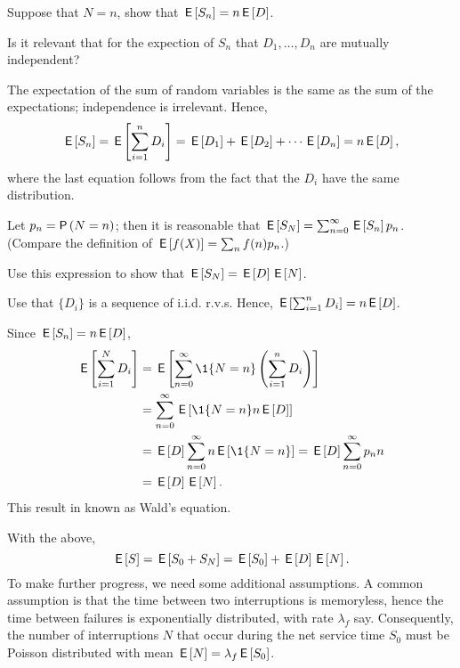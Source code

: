 \begin{exercise}
  Suppose that $N=n$, show that $\,\mathsf{E}\left[S_n\right]=n\,\mathsf{E}\left[D\right]$.

\begin{hint}
    Is it relevant that for the expection of $S_n$ that $D_1,\ldots, D_n$ are mutually independent?
  \end{hint}
\begin{solution}
The expectation of the sum of random variables is the same as the sum of the expectations; independence is irrelevant. Hence,
\begin{equation*}
  \,\mathsf{E}\left[S_n \right] =  \,\mathsf{E}\left[\sum_{i=1}^n D_i\right]= \,\mathsf{E}\left[D_1\right] + \,\mathsf{E}\left[D_2\right] + \cdots \,\mathsf{E}\left[D_n\right] = n \,\mathsf{E}\left[D\right],
\end{equation*}
where the last equation follows from the fact that the $D_i$ have the same distribution. 
\end{solution}
\end{exercise}

Let $p_n=\P{N=n}$; then it is reasonable that $\,\mathsf{E}\left[S_N\right]=\sum_{n=0}^\infty \,\mathsf{E}\left[S_n\right]p_n$. (Compare the definition of $\,\mathsf{E}\left[f(X)\right]=\sum_{n} f(n) p_n$.)

\begin{exercise}\label{ex:16}
Use this expression to show that $\,\mathsf{E}\left[S_N\right]=\,\mathsf{E}\left[D\right] \,\mathsf{E}\left[N\right]$.
\begin{hint}
  Use that $\{D_i\}$ is a sequence of i.i.d. r.v.s. Hence, $\,\mathsf{E}\left[\sum_{i=1}^n D_i\right] = n \,\mathsf{E}\left[D\right]$. 
\end{hint}
\begin{solution}
Since $\,\mathsf{E}\left[S_n\right] = n \,\mathsf{E}\left[D\right]$, 
\begin{align*}
  \E{\sum_{i=1}^N D_i} 
&=  \E{ \sum_{n=0}^\infty \1{N=n} \left(\sum_{i=1}^n D_i \right)} \\
&=  \sum_{n=0}^\infty \E{\1{N=n} n\E{D}} \\
&=  \E{D} \sum_{n=0}^\infty n \E{\1{N=n}} = \E D \sum_{n=0}^\infty p_n n \\
&= \E D \E N.
\end{align*}
This result in known as Wald's equation. 
\end{solution}
\end{exercise}

With the above, 
\begin{equation*}
  \,\mathsf{E}\left[S\right] = \,\mathsf{E}\left[S_0 + S_N\right] = \,\mathsf{E}\left[S_0\right] + \,\mathsf{E}\left[D\right] \,\mathsf{E}\left[N\right].
\end{equation*}
To make further progress, we need some additional assumptions. A common assumption is that the time between two interruptions is memoryless, hence the time between failures is exponentially distributed, with rate $\lambda_f$ say.  Consequently, the number of interruptions $N$ that occur during the net service time $S_0$ must be Poisson distributed with mean $\,\mathsf{E}\left[N\right] = \lambda_f \,\mathsf{E}\left[S_0\right]$. 


